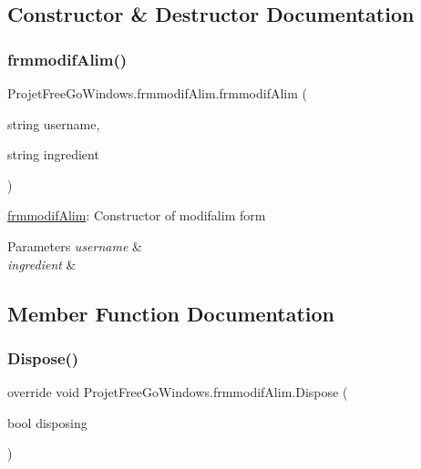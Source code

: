 \subsection{Constructor \& Destructor Documentation}
\mbox{\label{class_projet_free_go_windows_1_1frmmodif_alim_ae4dad1f3b57da9269eb3abdadeacc763}} 
\subsubsection{\texorpdfstring{frmmodif\+Alim()}{frmmodifAlim()}}
{\footnotesize\ttfamily Projet\+Free\+Go\+Windows.\+frmmodif\+Alim.\+frmmodif\+Alim (\begin{DoxyParamCaption}\item[{string}]{username,  }\item[{string}]{ingredient }\end{DoxyParamCaption})}



\hyperlink{class_projet_free_go_windows_1_1frmmodif_alim}{frmmodif\+Alim}\+: Constructor of modifalim form 


\begin{DoxyParams}{Parameters}
{\em username} & \\
\hline
{\em ingredient} & \\
\hline
\end{DoxyParams}


\subsection{Member Function Documentation}
\mbox{\label{class_projet_free_go_windows_1_1frmmodif_alim_a37e6c0909aa15804e3da5691c404020d}} 
\subsubsection{\texorpdfstring{Dispose()}{Dispose()}}
{\footnotesize\ttfamily override void Projet\+Free\+Go\+Windows.\+frmmodif\+Alim.\+Dispose (\begin{DoxyParamCaption}\item[{bool}]{disposing }\end{DoxyParamCaption})\hspace{0.3cm}{\ttfamily [protected]}}



